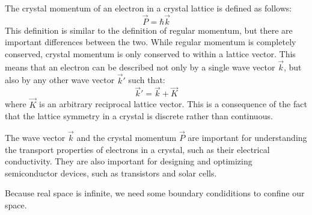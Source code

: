 The crystal momentum of an electron in a crystal lattice is defined as follows:
\begin{equation}
	\vec{P} = \hbar\vec{k}
\end{equation}
This definition is similar to the definition of regular momentum, but there are important differences between the two. While regular momentum is completely conserved, crystal momentum is only conserved to within a lattice vector. This means that an electron can be described not only by a single wave vector $\vec{k}$, but also by any other wave vector $\vec{k}'$ such that:
\begin{equation}
\vec{k}' = \vec{k} + \vec{K}
\end{equation}
where $\vec{K}$ is an arbitrary reciprocal lattice vector. This is a consequence of the fact that the lattice symmetry in a crystal is discrete rather than continuous. \\ \par
The wave vector $\vec{k}$ and the crystal momentum $\vec{P}$ are important for understanding the transport properties of electrons in a crystal, such as their electrical conductivity. They are also important for designing and optimizing semiconductor devices, such as transistors and solar cells.

Because real space is infinite, we need some boundary condiditions to confine our space.
